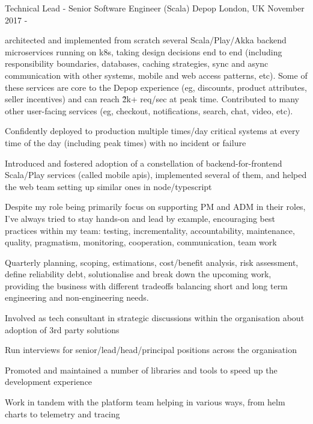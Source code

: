\begin{cventries}
\cventry
  {Technical Lead - Senior Software Engineer (Scala)}
{Depop}
	{London, UK}
	{November 2017 - \present{}}
{%
\begin{cvitems} 
\item architected and implemented from scratch several Scala/Play/Akka backend microservices running on k8s, taking design decisions end to end (including responsibility boundaries, databases, caching strategies, sync and async communication with other systems, mobile and web access patterns, etc). Some of these services are core to the Depop experience (eg, discounts, product attributes, seller incentives) and can reach \~ 2k+ req/sec at peak time. 
  Contributed to many other user-facing services (eg, checkout, notifications, search, chat, video, etc). 
\item Confidently deployed to production multiple times/day critical systems at every time of the day (including peak times) with no incident or failure 
  \item Introduced and fostered adoption of a constellation of backend-for-frontend Scala/Play services (called mobile apis), implemented several of them, and helped the web team setting up similar ones in node/typescript 
\item Despite my role being primarily focus on supporting PM and ADM in their roles, I've always tried to stay hands-on and lead by example, encouraging best practices within my team: testing, incrementality, accountability, maintenance, quality, pragmatism, monitoring, cooperation, communication, team work
\item Quarterly planning, scoping, estimations, cost/benefit analysis, risk assessment, define reliability debt, solutionalise and break down the upcoming work, providing the business with different tradeoffs balancing short and long term engineering and non-engineering needs. 
\item Involved as tech consultant in strategic discussions within the organisation about adoption of 3rd party solutions %
  \item Run interviews for senior/lead/head/principal positions across the organisation 
  \item Promoted and maintained a number of libraries and tools to speed up the development experience %
  \item Work in tandem with the platform team helping in various ways, from helm charts to telemetry and tracing %

\end{cvitems}}
\end{cventries}
